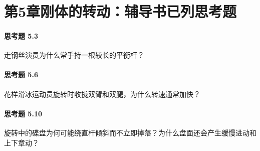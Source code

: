 \section*{第5章\quad 刚体的转动：辅导书已列思考题}
\paragraph{思考题 5.3}
走钢丝演员为什么常手持一根较长的平衡杆？

\paragraph{思考题 5.6}
花样滑冰运动员旋转时收拢双臂和双腿，为什么转速通常加快？

\paragraph{思考题 5.10}
旋转中的碟盘为何可能绕直杆倾斜而不立即掉落？为什么盘面还会产生缓慢进动和上下章动？
